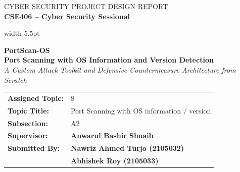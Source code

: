 \documentclass[11pt,a4paper]{article}
\begin{document}
\thispagestyle{empty}

\begin{flushright}
    {\color{darkslate!75}\large\scshape CYBER SECURITY PROJECT DESIGN REPORT}\\[4pt]
    {\color{darkslate!85}\normalsize\bfseries CSE406 -- Cyber Security Sessional}
\end{flushright}

\vspace*{2.0cm}

\noindent
{\color{secondary}\vrule width 5.5pt}%
\hspace*{18pt}%
\begin{minipage}{\dimexpr\textwidth-26pt\relax}
    {\fontsize{34pt}{40pt}\selectfont\bfseries\color{primary} PortScan-OS}\\[10pt]
    {\LARGE\bfseries\color{secondary} Port Scanning with OS Information and Version Detection}\\[10pt]
    {\large\itshape\color{darkslate} A Custom Attack Toolkit and Defensive Countermeasure Architecture from Scratch}
\end{minipage}

\vspace*{2.0cm}

\noindent
{\large\setlength{\tabcolsep}{14pt}\renewcommand{\arraystretch}{1.3}
\begin{tabular}{@{}ll@{}}
    \textbf{\color{secondary} Assigned Topic:}        & 8 \\
    \textbf{\color{secondary} Topic Title:}        & Port Scanning with OS information / version \\
    \textbf{\color{secondary} Subsection:}   & A2 \\
    \textbf{\color{secondary} Supervisor:}   & \textbf{Anwarul Bashir Shuaib} \\
    \textbf{\color{secondary} Submitted By:} & \textbf{Nawriz Ahmed Turjo (2105032)} \\
                                             & \textbf{Abhishek Roy (2105033)} \\
\end{tabular}}

\vfill
\end{document}
